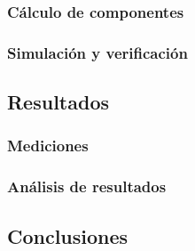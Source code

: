 \subsubsection{C\'alculo de componentes}

\subsubsection{Simulaci\'on y verificaci\'on}

\subsection{Resultados}

\subsubsection{Mediciones}

\subsubsection{An\'alisis de resultados}

\subsection{Conclusiones}